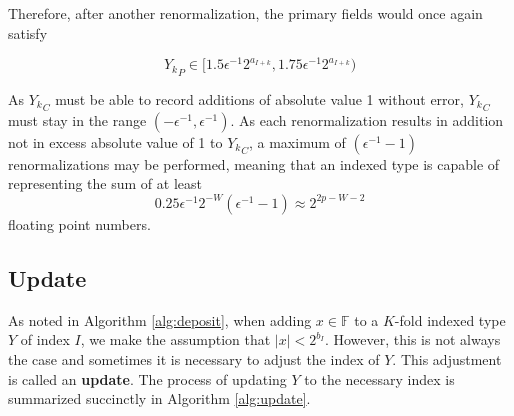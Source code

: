 \documentclass[12pt]{article}
\providecommand{\F}{\ensuremath{\mathbb{F}}}
\theoremstyle{definition}
\numberwithin{equation}{section}
\numberwithin{figure}{section}
\begin{document}
    Therefore, after another renormalization, the primary fields would once again satisfy

    \begin{equation*}
    {Y_k}_P \in [1.5  \epsilon^{-1} 2^{a_{I + k}}, 1.75  \epsilon^{-1} 2^{a_{I + k}})
    \end{equation*}

    As ${Y_k}_C$ must be able to record additions of absolute value 1 without error, ${Y_k}_C$ must stay in the range $(-\epsilon^{-1}, \epsilon^{-1})$. As each renormalization results in addition not in excess absolute value of 1 to ${Y_k}_C$, a maximum of $(\epsilon^{-1} - 1)$ renormalizations may be performed, meaning that an indexed type is capable of representing the sum of at least
    \begin{equation}
      0.25\epsilon^{-1}2^{-W}  (\epsilon^{-1} - 1) \approx 2^{2  p - W - 2}
      \label{eq:totalfreq}
    \end{equation}
    floating point numbers.

  \subsection{Update}
    \label{sec:primitiveops_update}
    As noted in Algorithm \ref{alg:deposit}, when adding $x \in \F$ to a $K$-fold indexed type $Y$ of index $I$, we make the assumption that $|x| < 2^{b_I}$. However, this is not always the case and sometimes it is necessary to adjust the index of $Y$. This adjustment is called an \textbf{update}. The process of updating $Y$ to the necessary index is summarized succinctly in Algorithm \ref{alg:update}.
\end{document}
